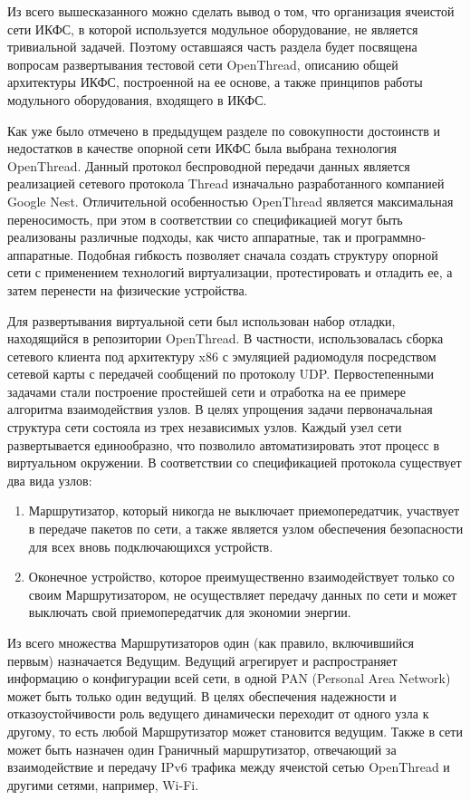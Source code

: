 Из всего вышесказанного можно сделать вывод о том, что организация ячеистой сети ИКФС, в которой используется модульное оборудование, не является тривиальной задачей. Поэтому оставшаяся часть раздела будет посвящена вопросам развертывания тестовой сети OpenThread, описанию общей архитектуры ИКФС, построенной на ее основе, а также принципов работы модульного оборудования, входящего в ИКФС.

Как уже было отмечено в предыдущем разделе по совокупности достоинств и недостатков в качестве опорной сети ИКФС была выбрана технология OpenThread. Данный протокол беспроводной передачи данных является реализацией сетевого протокола Thread изначально разработанного компанией Google Nest. Отличительной особенностью OpenThread является максимальная переносимость, при этом в соответствии со спецификацией  могут быть реализованы различные подходы, как чисто аппаратные, так и программно-аппаратные. Подобная гибкость позволяет сначала создать структуру опорной сети с применением технологий виртуализации, протестировать и отладить ее, а затем перенести на физические устройства.

Для развертывания виртуальной сети был использован набор отладки, находящийся в репозитории OpenThread. В частности, использовалась сборка сетевого клиента под архитектуру x86 с эмуляцией радиомодуля посредством сетевой карты с передачей сообщений по протоколу UDP. Первостепенными задачами стали построение простейшей сети и отработка на ее примере алгоритма взаимодействия узлов. В целях упрощения задачи первоначальная структура сети состояла из трех независимых узлов. Каждый узел сети развертывается единообразно, что позволило автоматизировать этот процесс в виртуальном окружении.
В соответствии со спецификацией протокола существует два вида узлов: 

\begin{enumerate}
	\item Маршрутизатор, который никогда не выключает приемопередатчик, участвует в передаче пакетов по сети, а также является узлом обеспечения безопасности для всех вновь подключающихся устройств.
	\item Оконечное устройство, которое преимущественно взаимодействует только со своим Маршрутизатором, не осуществляет передачу данных по сети и может выключать свой приемопередатчик для экономии энергии.
\end{enumerate}

Из всего множества Маршрутизаторов один (как правило, включившийся первым) назначается Ведущим. Ведущий агрегирует и распространяет информацию о конфигурации всей сети, в одной PAN (Personal Area Network) может быть только один ведущий.  В целях обеспечения надежности и отказоустойчивости роль ведущего динамически переходит от одного узла к другому, то есть любой Маршрутизатор может становится ведущим. Также в сети может быть назначен один Граничный маршрутизатор, отвечающий за взаимодействие и передачу IPv6 трафика между ячеистой сетью OpenThread и другими сетями, например, Wi-Fi.

